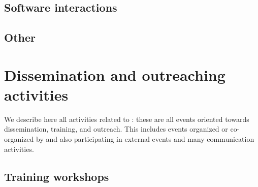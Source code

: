 \documentclass{deliverablereport}
\begin{document}




\subsection{Software interactions}



















\subsection{Other}





\section{Dissemination and outreaching activities}

We describe here all activities related to :
these are all events oriented towards dissemination, training, and outreach. This
includes events organized or co-organized by \ODK and also
participating in external events and many communication activities.

\subsection{Training workshops}










\end{document}

